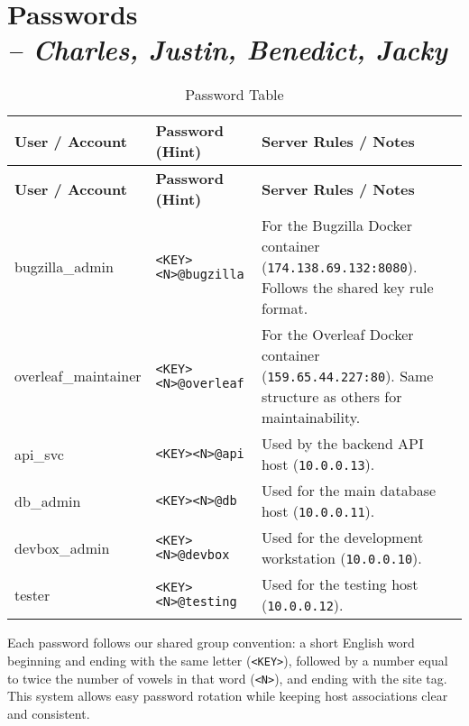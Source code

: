 \chapter[Passwords]{Passwords\\\small{\textit{-- Charles, Justin, Benedict, Jacky}}}
\label{Chapter::Passwords}

\begin{longtable}{|p{3.5cm}||p{4.5cm}||p{8cm}|}
\caption{Password Table \label{Table::PasswordTable}}\\
\hline
\textbf{User / Account} & \textbf{Password (Hint)} & \textbf{Server Rules / Notes} \\
\hline
\endfirsthead
\hline
\textbf{User / Account} & \textbf{Password (Hint)} & \textbf{Server Rules / Notes} \\
\hline
\endhead

bugzilla\_admin & \texttt{<KEY><N>@bugzilla} & For the Bugzilla Docker container (\texttt{174.138.69.132:8080}). Follows the shared key rule format. \\
\hline

overleaf\_maintainer & \texttt{<KEY><N>@overleaf} & For the Overleaf Docker container (\texttt{159.65.44.227:80}). Same structure as others for maintainability. \\
\hline

api\_svc & \texttt{<KEY><N>@api} & Used by the backend API host (\texttt{10.0.0.13}). \\
\hline

db\_admin & \texttt{<KEY><N>@db} & Used for the main database host (\texttt{10.0.0.11}). \\
\hline

devbox\_admin & \texttt{<KEY><N>@devbox} & Used for the development workstation (\texttt{10.0.0.10}). \\
\hline

tester & \texttt{<KEY><N>@testing} & Used for the testing host (\texttt{10.0.0.12}). \\
\hline

\end{longtable}

\noindent
Each password follows our shared group convention: a short English word beginning and ending with the same letter (\texttt{<KEY>}), followed by a number equal to twice the number of vowels in that word (\texttt{<N>}), and ending with the site tag. This system allows easy password rotation while keeping host associations clear and consistent.
